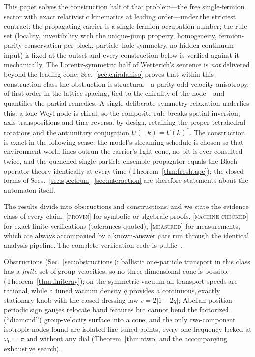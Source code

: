 \documentclass[aps,prd,twocolumn,superscriptaddress,nofootinbib,floatfix]{revtex4-2}
\newcommand{\evP}{\textnormal{\textsc{[proven]}}}
\newcommand{\evM}{\textnormal{\textsc{[machine-checked]}}}
\newcommand{\evX}{\textnormal{\textsc{[measured]}}}
\begin{document}
This paper solves the construction half of that problem---the free
single-fermion sector with exact relativistic kinematics at leading
order---under the strictest contract: the propagating carrier is a
single-fermion occupation number; the rule set (locality, invertibility
with the unique-jump property, homogeneity, fermion-parity conservation
per block, particle--hole symmetry, no hidden continuum input) is fixed
at the outset and every construction below is verified against it
mechanically. The Lorentz-symmetric half of Wetterich's sentence is
\emph{not} delivered beyond the leading cone: Sec.~\ref{sec:chiralaniso}
proves that within this construction class the obstruction is
structural---a parity-odd velocity anisotropy, of first order in the
lattice spacing, tied to the chirality of the node---and quantifies the
partial remedies. A single deliberate symmetry relaxation underlies
this: a lone Weyl node is chiral, so the composite rule breaks spatial
inversion, axis transpositions and time reversal by design, retaining
the proper tetrahedral rotations and the antiunitary conjugation
$U(-k)=U(k)^*$. The construction is exact in the
following sense: the model's streaming schedule is chosen so that
environment world-lines outrun the carrier's light cone, no bit is ever
consulted twice, and the quenched single-particle ensemble propagator
equals the Bloch operator theory identically at every time
(Theorem~\ref{thm:freshtape}); the closed forms of
Secs.~\ref{sec:spectrum}--\ref{sec:interaction} are therefore statements
about the automaton itself.

The results divide into obstructions and constructions, and we state the
evidence class of every claim: \evP{} for symbolic or algebraic proofs,
\evM{} for exact finite verifications (tolerances quoted), \evX{} for
measurements, which are always accompanied by a known-answer gate run
through the identical analysis pipeline. The complete verification code is
public~\cite{repo}.

Obstructions (Sec.~\ref{sec:obstructions}): ballistic one-particle
transport in this class has a \emph{finite} set of group velocities, so no
three-dimensional cone is possible (Theorem~\ref{thm:finiteray}); on the
symmetric vacuum all transport speeds are rational, while a tuned vacuum
density $q$ provides a continuous, exactly stationary knob with the closed
dressing law $v=2|1-2q|$; Abelian position-periodic sign gauges relocate
band features but cannot bend the factorized (``diamond'') group-velocity
surface into a cone; and the only two-component isotropic nodes found
are isolated fine-tuned points, every one frequency locked at
$\omega_0=\pi$ and without any dial (Theorem~\ref{thm:ntwo} and the
accompanying exhaustive search).
\end{document}
